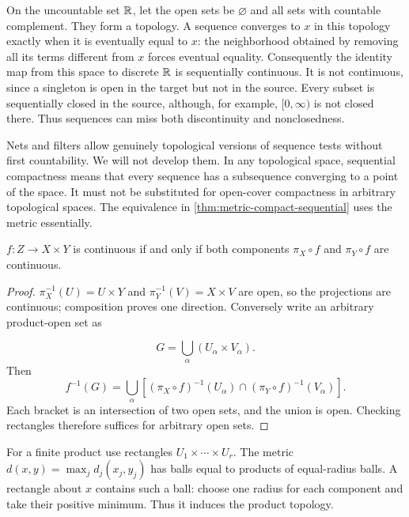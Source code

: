 \begin{example}\label{ex:cocountable-sequences}
On the uncountable set $\mathbb{R}$, let the open sets be $\varnothing$ and all
sets with countable complement. They form a topology. A sequence
converges to $x$ in this topology exactly when it is eventually equal to
$x$: the neighborhood obtained by removing all its terms different from
$x$ forces eventual equality. Consequently the identity map from this
space to discrete $\mathbb{R}$ is sequentially continuous. It is not continuous,
since a singleton is open in the target but not in the source.
Every subset is sequentially closed in the source, although, for example,
$[0,\infty)$ is not closed there. Thus sequences can miss both
discontinuity and nonclosedness.
\end{example}
Nets and filters allow genuinely topological versions of sequence tests
without first countability. We will not develop them. In any topological
space, sequential compactness means that every sequence has a subsequence
converging to a point of the space. It must not be substituted for
open-cover compactness in arbitrary topological spaces. The equivalence
in \cref{thm:metric-compact-sequential} uses the metric essentially.


\begin{proposition}\label{prop:product-continuity}
$f:Z\to X\times Y$ is continuous if and only if both components
$\pi_X\circ f$ and $\pi_Y\circ f$ are continuous.
\end{proposition}
\begin{proof}
$\pi_X^{-1}(U)=U\times Y$ and $\pi_Y^{-1}(V)=X\times V$ are open,
so the projections are continuous; composition proves one direction.
Conversely write an arbitrary product-open set as

\[
G=\bigcup_\alpha(U_\alpha\times V_\alpha).
\]
 Then
\[
f^{-1}(G)=\bigcup_\alpha\left[
(\pi_X\circ f)^{-1}(U_\alpha)\cap
(\pi_Y\circ f)^{-1}(V_\alpha)\right].
\]
Each bracket is an intersection of two open sets, and the union is open.
Checking rectangles therefore suffices for arbitrary open sets.
\end{proof}
For a finite product use rectangles $U_1\times\cdots\times U_r$.
The metric $d(x,y)=\max_jd_j(x_j,y_j)$ has balls equal to products of
equal-radius balls. A rectangle about $x$ contains such a ball: choose one
radius for each component and take their positive minimum. Thus it induces
the product topology.

